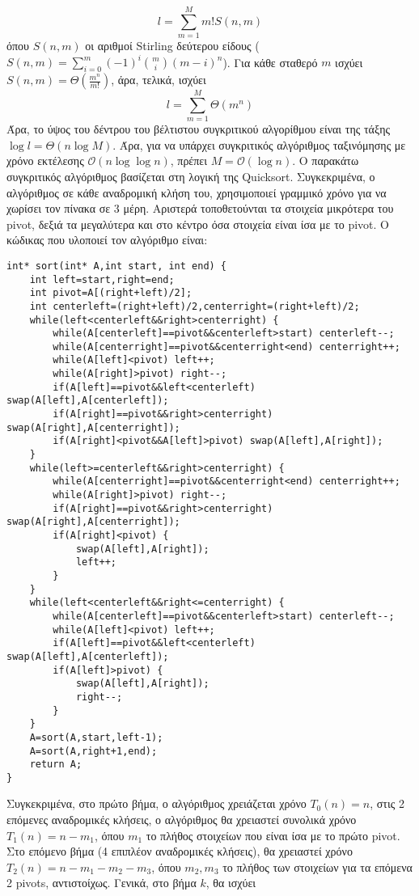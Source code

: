 \documentclass[12pt]{article}
\newcommand\en[1]{\latintext #1\greektext}
\newcommand\bigOh{\mathcal{O}}
\begin{document}
$$l=\sum_{m=1}^Mm!S\left(n,m\right)$$
όπου $S\left(n,m\right)$ οι αριθμοί \en{Stirling} δεύτερου είδους ($S\left(n,m\right)=\sum_{i=0}^m\left(-1\right)^i\binom{m}{i}\left(m-i\right)^n$). Για κάθε σταθερό $m$ ισχύει $S\left(n,m\right)=\Theta\left(\frac{m^n}{m!}\right)$, άρα, τελικά, ισχύει
$$l=\sum_{m=1}^M\Theta\left(m^n\right)$$
Άρα, το ύψος του δέντρου του βέλτιστου συγκριτικού αλγορίθμου είναι της τάξης $\log l=\Theta\left(n\log M\right)$. Άρα, για να υπάρχει συγκριτικός αλγόριθμος ταξινόμησης με χρόνο εκτέλεσης $\bigOh\left(n\log\log n\right)$, πρέπει $M=\bigOh\left(\log n\right)$. Ο παρακάτω συγκριτικός αλγόριθμος βασίζεται στη λογική της \en{Quicksort}. Συγκεκριμένα, ο αλγόριθμος σε κάθε αναδρομική κλήση του, χρησιμοποιεί γραμμικό χρόνο για να χωρίσει τον πίνακα σε 3 μέρη. Αριστερά τοποθετούνται τα στοιχεία μικρότερα του \en{pivot}, δεξιά τα μεγαλύτερα και στο κέντρο όσα στοιχεία είναι ίσα με το \en{pivot}. Ο κώδικας που υλοποιεί τον αλγόριθμο είναι:
\latintext
\begin{lstlisting}
int* sort(int* A,int start, int end) {
	int left=start,right=end;
	int pivot=A[(right+left)/2];
	int centerleft=(right+left)/2,centerright=(right+left)/2;
	while(left<centerleft&&right>centerright) {
		while(A[centerleft]==pivot&&centerleft>start) centerleft--;
		while(A[centerright]==pivot&&centerright<end) centerright++;
		while(A[left]<pivot) left++;
		while(A[right]>pivot) right--;
		if(A[left]==pivot&&left<centerleft) swap(A[left],A[centerleft]);
		if(A[right]==pivot&&right>centerright) swap(A[right],A[centerright]);
		if(A[right]<pivot&&A[left]>pivot) swap(A[left],A[right]);
	}
	while(left>=centerleft&&right>centerright) {
		while(A[centerright]==pivot&&centerright<end) centerright++;
		while(A[right]>pivot) right--;
		if(A[right]==pivot&&right>centerright) swap(A[right],A[centerright]);
		if(A[right]<pivot) {
			swap(A[left],A[right]);
			left++;
		}
	}
	while(left<centerleft&&right<=centerright) {
		while(A[centerleft]==pivot&&centerleft>start) centerleft--;
		while(A[left]<pivot) left++;
		if(A[left]==pivot&&left<centerleft) swap(A[left],A[centerleft]);
		if(A[left]>pivot) {
			swap(A[left],A[right]);
			right--;
		}
	}
	A=sort(A,start,left-1);
	A=sort(A,right+1,end);
	return A;
}
\end{lstlisting}
\greektext
Συγκεκριμένα, στο πρώτο βήμα, ο αλγόριθμος χρειάζεται χρόνο $T_0\left(n\right)=n$, στις 2 επόμενες αναδρομικές κλήσεις, ο αλγόριθμος θα χρειαστεί συνολικά χρόνο $T_1\left(n\right)=n-m_1$, όπου $m_1$ το πλήθος στοιχείων που είναι ίσα με το πρώτο \en{pivot}. Στο επόμενο βήμα (4 επιπλέον αναδρομικές κλήσεις), θα χρειαστεί χρόνο $T_2\left(n\right)=n-m_1-m_2-m_3$, όπου $m_2,m_3$ το πλήθος των στοιχείων για τα επόμενα 2 \en{pivots}, αντιστοίχως. Γενικά, στο βήμα $k$, θα ισχύει
\end{document}
